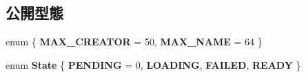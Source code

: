 \subsection*{公開型態}
\begin{DoxyCompactItemize}
\item 
enum \{ {\bfseries M\+A\+X\+\_\+\+C\+R\+E\+A\+T\+OR} = 50, 
{\bfseries M\+A\+X\+\_\+\+N\+A\+ME} = 64
 \}\hypertarget{class_i_dream_sky_1_1_resource_access_aacb6fd66793306373f7cd1f6d8586877}{}\label{class_i_dream_sky_1_1_resource_access_aacb6fd66793306373f7cd1f6d8586877}

\item 
enum {\bfseries State} \{ {\bfseries P\+E\+N\+D\+I\+NG} = 0, 
{\bfseries L\+O\+A\+D\+I\+NG}, 
{\bfseries F\+A\+I\+L\+ED}, 
{\bfseries R\+E\+A\+DY}
 \}\hypertarget{class_i_dream_sky_1_1_resource_access_a6a8025010c976368f7c8a235b6c50a64}{}\label{class_i_dream_sky_1_1_resource_access_a6a8025010c976368f7c8a235b6c50a64}

\end{DoxyCompactItemize}
